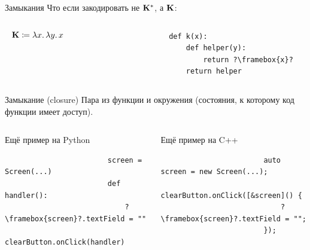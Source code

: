     \begin{frame}[fragile]{Замыкания}
        Что если закодировать не $\mathbf{K}^*$, а $\mathbf{K}$:
        \vspace{-1em}
        \begin{columns}[onlytextwidth]
            \begin{column}[t]{0.485\textwidth}
                \vspace{0.5em}
                \[\mathbf{K} \coloneqq \lambda x\ldotp \lambda y\ldotp x\]
            \end{column}\hfill%
            \begin{column}[t]{0.485\textwidth}
                \begin{verbatim}
                    def k(x):
                        def helper(y):
                            return ?\framebox{x}?
                        return helper
                \end{verbatim}
            \end{column}
        \end{columns}
        \pause
        \begin{block}{Замыкание (closure)}
            Пара из функции и окружения (состояния, к которому код функции имеет доступ).
        \end{block}
        \pause
        \vspace{-1em}
        \begin{columns}[onlytextwidth]
            \begin{column}[t]{0.485\textwidth}
                \begin{block}{Ещё пример на Python}
                    \begin{verbatim}
                        screen = Screen(...)
                        def handler():
                            ?\framebox{screen}?.textField = ""
                        clearButton.onClick(handler)
                    \end{verbatim}
                \end{block}
            \end{column}\hfill
            \pause%
            \begin{column}[t]{0.485\textwidth}
                \begin{block}{Ещё пример на C++}
                    \begin{verbatim}
                        auto screen = new Screen(...);
                        clearButton.onClick([&screen]() {
                            ?\framebox{screen}?.textField = "";
                        });
                    \end{verbatim}
                \end{block}
            \end{column}
        \end{columns}
    \end{frame}

